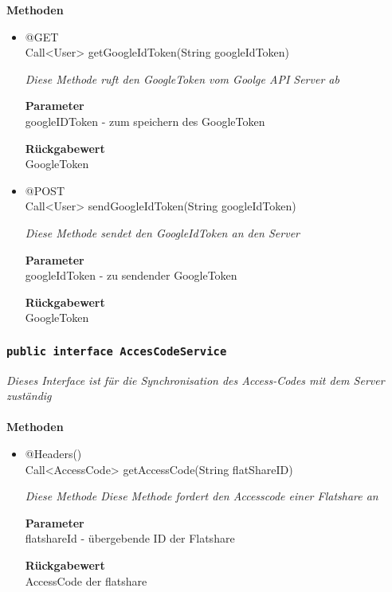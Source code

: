 	\textbf{Methoden} \\
		\begin{itemize}
		\item{@GET\\ Call<User> getGoogleIdToken(String googleIdToken)}

		\textit{Diese Methode ruft den GoogleToken vom Goolge API Server ab}

		\textbf{Parameter} \\
	googleIDToken - zum speichern des GoogleToken

		\textbf{Rückgabewert} \\
	GoogleToken

      \item{@POST\\ Call<User> sendGoogleIdToken(String googleIdToken)}

		\textit{Diese Methode sendet den GoogleIdToken an den Server}

		\textbf{Parameter} \\
		googleIdToken - zu sendender GoogleToken

		\textbf{Rückgabewert} \\
	GoogleToken

	 \end{itemize}

	\subsubsection{\texttt{public interface AccesCodeService}}
\textit{Dieses Interface ist für die Synchronisation des Access-Codes mit dem Server zuständig }\\
\\
	\textbf{Methoden} \\
		\begin{itemize}
		\item{@Headers()\\ Call<AccessCode> getAccessCode(String flatShareID)}

		\textit{Diese Methode Diese Methode fordert den Accesscode einer Flatshare an}

		\textbf{Parameter} \\
	flatshareId - übergebende ID der Flatshare

		\textbf{Rückgabewert} \\
	AccessCode der flatshare


	 \end{itemize}

